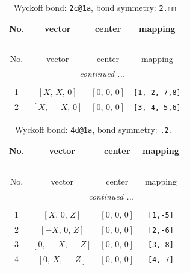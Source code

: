 \documentclass[fleqn,8pt]{jsarticle}
\begin{document}
\renewcommand{\arraystretch}{1.2}
\begin{longtable}{cccc}
\caption{Wyckoff bond: {\tt 2c@1a}, bond symmetry: {\tt 2.mm}}
 \\
 \hline \hline
No. & vector & center & mapping \\ \hline \endfirsthead

\multicolumn{3}{l}{\tablename\ \thetable{}} \\
 \hline \hline
No. & vector & center & mapping \\ \hline \endhead

 \hline \hline
\multicolumn{3}{r}{\footnotesize\it continued ...} \\ \endfoot

 \hline \hline
\multicolumn{3}{r}{} \\ \endlastfoot

1 & $\left[ X,\, X,\, 0 \right]$ & $\left[ 0,\, 0,\, 0 \right]$ & {\tt [1,-2,-7,8]} \\ \hline
2 & $\left[ X,\, - X,\, 0 \right]$ & $\left[ 0,\, 0,\, 0 \right]$ & {\tt [3,-4,-5,6]} \\
\end{longtable}
\renewcommand{\arraystretch}{1.2}
\begin{longtable}{cccc}
\caption{Wyckoff bond: {\tt 4d@1a}, bond symmetry: {\tt .2.}}
 \\
 \hline \hline
No. & vector & center & mapping \\ \hline \endfirsthead

\multicolumn{3}{l}{\tablename\ \thetable{}} \\
 \hline \hline
No. & vector & center & mapping \\ \hline \endhead

 \hline \hline
\multicolumn{3}{r}{\footnotesize\it continued ...} \\ \endfoot

 \hline \hline
\multicolumn{3}{r}{} \\ \endlastfoot

1 & $\left[ X,\, 0,\, Z \right]$ & $\left[ 0,\, 0,\, 0 \right]$ & {\tt [1,-5]} \\ \hline
2 & $\left[ - X,\, 0,\, Z \right]$ & $\left[ 0,\, 0,\, 0 \right]$ & {\tt [2,-6]} \\ \hline
3 & $\left[ 0,\, - X,\, - Z \right]$ & $\left[ 0,\, 0,\, 0 \right]$ & {\tt [3,-8]} \\ \hline
4 & $\left[ 0,\, X,\, - Z \right]$ & $\left[ 0,\, 0,\, 0 \right]$ & {\tt [4,-7]} \\
\end{longtable}
\end{document}
